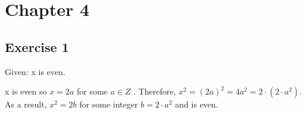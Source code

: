 \documentclass[a4paper]{article}
\begin{document}
\section{Chapter 4}

\subsection{Exercise 1}

Given: x is even.

x is even so $x = 2a$ for some $ a \in Z $ . Therefore,
$ x^2 = (2a)^2 = 4a^2 = 2\cdot(2\cdot a^2)$. As a result, $x^2 = 2b$
for some integer $b = 2 \cdot a^2 $ and is even.
\end{document}
